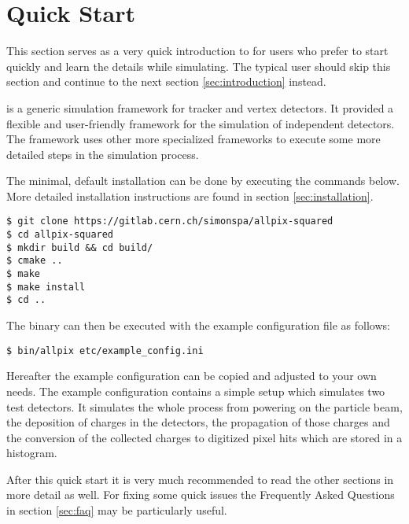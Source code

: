 \section{Quick Start}
This section serves as a very quick introduction to \apsq for users who prefer to start quickly and learn the details while simulating. The typical user should skip this section and continue to the next section \ref{sec:introduction} instead. 

\apsq is a generic simulation framework for tracker and vertex detectors. It provided a flexible and user-friendly framework for the simulation of independent detectors. The framework uses other more specialized frameworks to execute some more detailed steps in the simulation process.

The minimal, default installation can be done by executing the commands below. More detailed installation instructions are found in section \ref{sec:installation}.
\begin{verbatim}
$ git clone https://gitlab.cern.ch/simonspa/allpix-squared
$ cd allpix-squared
$ mkdir build && cd build/
$ cmake ..
$ make
$ make install
$ cd ..
\end{verbatim}
The binary can then be executed with the example configuration file as follows:
\begin{verbatim}
$ bin/allpix etc/example_config.ini
\end{verbatim}

Hereafter the example configuration can be copied and adjusted to your own needs. The example configuration contains a simple setup which simulates two test detectors. It simulates the whole process from powering on the particle beam, the deposition of charges in the detectors, the propagation of those charges and the conversion of the collected charges to digitized pixel hits which are stored in a histogram.

After this quick start it is very much recommended to read the other sections in more detail as well. For fixing some quick issues the Frequently Asked Questions in section \ref{sec:faq} may be particularly useful.
